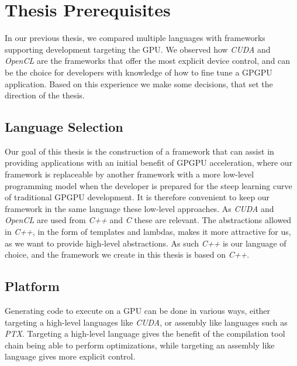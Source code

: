 \section{Thesis Prerequisites}
In our previous thesis\cite{sw9Report}, we compared multiple languages with frameworks supporting development targeting the GPU. We observed how \textit{CUDA} and \textit{OpenCL} are the frameworks that offer the most explicit device control, and can be the choice for developers with knowledge of how to fine tune a GPGPU application. Based on this experience we make some decisions, that set the direction of the thesis.

\subsection{Language Selection}\label{cha:languageSelection}
Our goal of this thesis is the construction of a framework that can assist in providing applications with an initial benefit of GPGPU acceleration, where our framework is replaceable by another framework with a more low-level programming model when the developer is prepared for the steep learning curve of traditional GPGPU development. It is therefore convenient to keep our framework in the same language these low-level approaches. As \textit{CUDA} and \textit{OpenCL} are used from \textit{C++} and \textit{C} these are relevant. The abstractions allowed in \textit{C++}, in the form of templates and lambdas, makes it more attractive for us, as we want to provide high-level abstractions. As such \textit{C++} is our language of choice, and the framework we create in this thesis is based on \textit{C++}.

\subsection{Platform}
Generating code to execute on a GPU can be done in various ways, either targeting a high-level languages like \textit{CUDA}, or assembly like languages such as \textit{PTX}. Targeting a high-level language gives the benefit of the compilation tool chain being able to perform optimizations, while targeting an assembly like language gives more explicit control.


